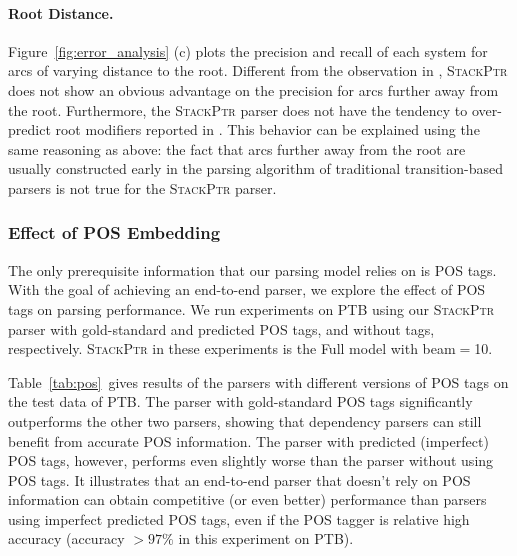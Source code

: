 \documentclass[11pt,a4paper]{article}
\begin{document}
\paragraph{Root Distance.}
Figure~\ref{fig:error_analysis} (c) plots the precision and recall of each system for arcs of varying distance to the root. 
Different from the observation in \citet{mcdonald2011analyzing}, \textsc{StackPtr} does not show an obvious advantage on the precision for arcs further away from the root. 
Furthermore, the \textsc{StackPtr} parser does not have the tendency to over-predict root modifiers reported in \citet{mcdonald2011analyzing}. 
This behavior can be explained using the same reasoning as above: the fact that arcs further away from the root are usually constructed early in the parsing algorithm of traditional transition-based parsers is not true for the \textsc{StackPtr} parser.

\subsubsection{Effect of POS Embedding}
The only prerequisite information that our parsing model relies on is POS tags. 
With the goal of achieving an end-to-end parser, we explore the effect of POS tags on parsing performance.
We run experiments on PTB using our \textsc{StackPtr} parser with gold-standard and predicted POS tags, and without tags, respectively.
\textsc{StackPtr} in these experiments is the \textsf{Full} model with beam$=$10.  

Table~\ref{tab:pos}~gives results of the parsers with different versions of POS tags on the test data of PTB.
The parser with gold-standard POS tags significantly outperforms the other two parsers, showing that dependency parsers can still benefit from accurate POS information. 
The parser with predicted (imperfect) POS tags, however, performs even slightly worse than the parser without using POS tags.
It illustrates that an end-to-end parser that doesn't rely on POS information can obtain competitive (or even better) performance than parsers using imperfect predicted POS tags, even if the POS tagger is relative high accuracy (accuracy $> 97\%$ in this experiment on PTB).
\end{document}
